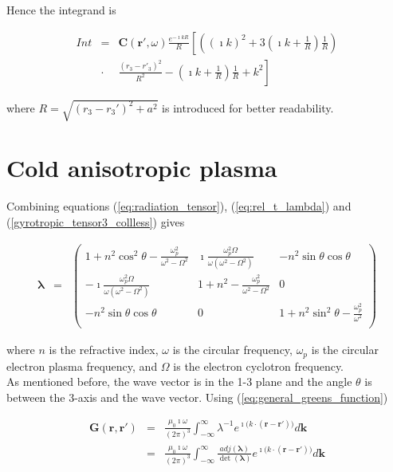 \documentclass[a4paper,11pt]{thesis}
\begin{document}
Hence the integrand is

\begin{eqnarray}
    Int&=&\mathbf{C}(\mathbf{r'},\omega) \frac{e^{- \imath k R}}{R} \left[  \left( ( \imath k)^2+ 3 \left( \imath k + \frac{1}{R} \right)\frac{1}{R} \right)  \right.\\
   &\cdot& \left. \frac{(r_3-r'_3)^2}{R^2} -\left(   \imath k+ \frac{1}{R}\right)  \frac{1}{R}     +      k^2 \right] \nonumber
\end{eqnarray}

where $R=\sqrt{(r_3-r_3')^2+a^2}$ is introduced for better readability.

\section{Cold anisotropic plasma}
Combining equations (\ref{eq:radiation_tensor}), (\ref{eq:rel_t_lambda}) and  (\ref{gyrotropic_tensor3_collless}) gives


\begin{eqnarray}
    \mathbf{\lambda}&=&
\left(%
\begin{array}{ccc}
   1+n^2 \cos^2 \theta -\frac{\omega_p^2}{\omega^2 -\Omega^2} &  \imath \frac{\omega_p^2 \Omega}{\omega(\omega^2-\Omega^2)} & -n^2 \sin \theta \cos \theta \\
-\imath \frac{\omega_p^2 \Omega}{\omega(\omega^2-\Omega^2)}&  1+n^2-\frac{\omega_p^2}{\omega^2 -\Omega^2} & 0\\
 -n^2 \sin \theta \cos \theta  & 0 &   1+n^2 \sin^2 \theta -\frac{\omega_p^2}{\omega^2} \\
\end{array}%
\right) \nonumber
\end{eqnarray}

where $n$ is the refractive index, $\omega$ is the circular frequency, $\omega_p$ is the circular electron plasma frequency, and $\Omega$ is the electron cyclotron frequency.\\

As mentioned before, the wave vector is in the 1-3 plane and the angle $\theta$ is between the 3-axis and the wave vector. Using (\ref{eq:general_greens_function})

\begin{eqnarray}
    \mathbf{G}(\mathbf{r},\mathbf{r'})
&=& \frac{\mu_0 \imath \omega }{(2\pi )^3}\int_{-\infty}^{\infty}\lambda^{-1} e^{\imath \mathbf(k \cdot (\mathbf{r}-\mathbf{r}'))}d\mathbf{k}\\
&=& \frac{\mu_0 \imath \omega }{(2\pi )^3}\int_{-\infty}^{\infty}\frac{adj(\mathbf{\lambda})}{\det (\mathbf{\lambda})}e^{\imath \mathbf(k \cdot (\mathbf{r}-\mathbf{r}'))}d\mathbf{k}
\end{eqnarray}
\end{document}
